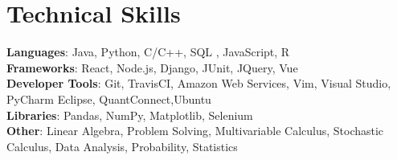 \documentclass[letterpaper,11pt]{article}
\begin{document}
%
\section{Technical Skills}
 \begin{itemize}[leftmargin=0.15in, label={}]
    \small{\item{
     \textbf{Languages}{: Java, Python, C/C++, SQL , JavaScript, R} \\
     \textbf{Frameworks}{: React, Node.js, Django, JUnit, JQuery, Vue} \\
     \textbf{Developer Tools}{: Git, TravisCI, Amazon Web Services, Vim, Visual Studio, PyCharm Eclipse, QuantConnect,Ubuntu} \\
     \textbf{Libraries}{: Pandas, NumPy, Matplotlib, Selenium}\\
     \textbf{Other}{: Linear Algebra, Problem Solving, Multivariable Calculus, Stochastic Calculus, Data Analysis, Probability, Statistics}
    }}
 \end{itemize}


\end{document}
